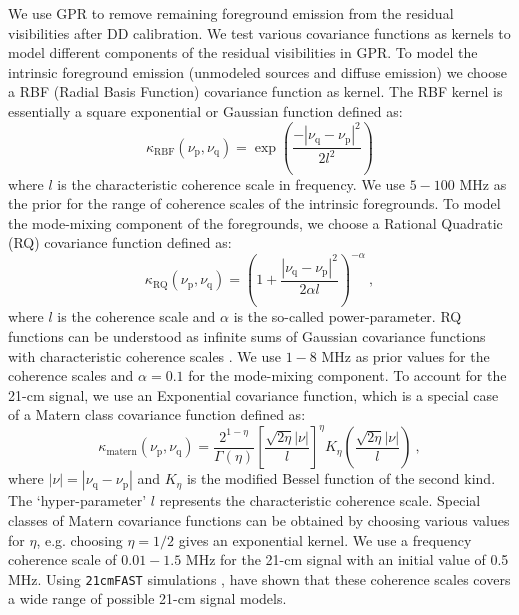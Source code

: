 \documentclass[fleqn,usenatbib]{mnras}
\begin{document}
We use GPR to remove remaining foreground emission from the residual visibilities after DD calibration. We test various covariance functions as kernels to model different components of the residual visibilities in GPR. To model the intrinsic foreground emission (unmodeled sources and diffuse emission) we choose a RBF (Radial Basis Function) covariance function as kernel. The RBF kernel is essentially a square exponential or Gaussian function defined as:
\begin{equation}
\kappa_{\text{RBF}} (\nu_{\text{p}},\nu_{\text{q}}) = \exp \left( \dfrac{-|\nu_{\text{q}} - \nu_{\text{p}}|^2}{2l^2} \right)
\end{equation}
where $l$ is the characteristic coherence scale in frequency. We use $5-100$ MHz as the prior for the range of coherence scales of the intrinsic foregrounds. To model the mode-mixing component of the foregrounds, we choose a Rational Quadratic (RQ) covariance function defined as:
\begin{equation}
\kappa_{\text{RQ}} (\nu_{\text{p}},\nu_{\text{q}}) = \left( 1 + \dfrac{|\nu_{\text{q}} - \nu_{\text{p}}|^2}{2\alpha l} \right)^{-\alpha} \ ,
\end{equation}
where $l$ is the coherence scale and $\alpha$ is the so-called power-parameter. RQ functions can be understood as infinite sums of Gaussian covariance functions with characteristic coherence scales \citep{rasmussen2005}. We use $1-8$ MHz as prior values for the coherence scales and $\alpha = 0.1$ for the mode-mixing component. To account for the 21-cm signal, we use an Exponential covariance function, which is a special case of a Matern class covariance function \citep{stein1999} defined as:
\begin{equation}
\kappa_{\text{matern}} (\nu_{\text{p}},\nu_{\text{q}}) = \dfrac{2^{1-\eta}}{\Gamma (\eta)} \left[ \dfrac{\sqrt{2\eta}|\nu|}{l} \right]^{\eta} K_{\eta} \left( \dfrac{\sqrt{2\eta}|\nu|}{l} \right) \ ,
\end{equation}
where $|\nu| = |\nu_{\text{q}} - \nu_{\text{p}}|$ and $K_{\eta}$ is the modified Bessel function of the second kind. The `hyper-parameter' $l$ represents the characteristic coherence scale. Special classes of Matern covariance functions can be obtained by choosing various values for $\eta$, e.g. choosing $\eta = 1/2$ gives an exponential kernel. We use a frequency coherence scale of $0.01-1.5$ MHz for the 21-cm signal with an initial value of 0.5 MHz. Using \texttt{21cmFAST} simulations \citep{mesinger2007,mesinger2011}, \cite{mertens2018} have shown that these coherence scales covers a wide range of possible 21-cm signal models.
\end{document}

